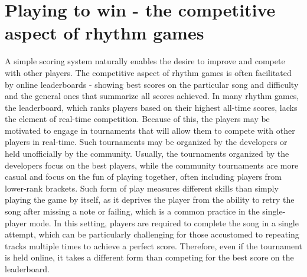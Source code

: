 \section{Playing to win - the competitive aspect of rhythm games}
A simple scoring system naturally enables the desire to improve and compete with other players. The competitive aspect of rhythm games is often facilitated by online leaderboards - showing best scores on the particular song and difficulty and the general ones that summarize all scores achieved. In many rhythm games, the leaderboard, which ranks players based on their highest all-time scores, lacks the element of real-time competition. Because of this, the players may be motivated to engage in tournaments that will allow them to compete with other players in real-time. Such tournaments may be organized by the developers or held unofficially by the community. Usually, the tournaments organized by the developers focus on the best players, while the community tournaments are more casual and focus on the fun of playing together, often including players from lower-rank brackets. Such form of play measures different skills than simply playing the game by itself, as it deprives the player from the ability to retry the song after missing a note or failing, which is a common practice in the single-player mode. In this setting, players are required to complete the song in a single attempt, which can be particularly challenging for those accustomed to repeating tracks multiple times to achieve a perfect score. Therefore, even if the tournament is held online, it takes a different form than competing for the best score on the leaderboard.


